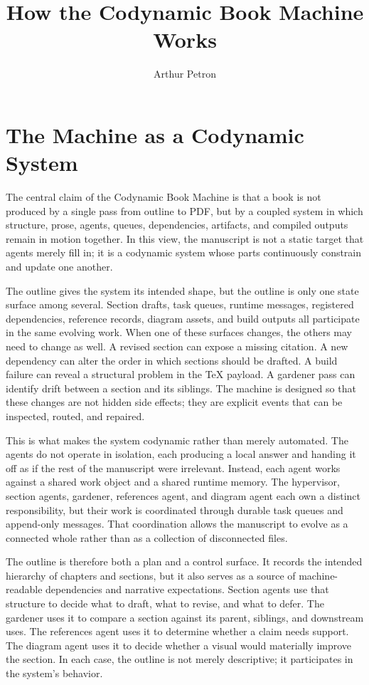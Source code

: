 \documentclass[11pt]{article}
\title{How the Codynamic Book Machine Works}
\author{Arthur Petron}
\begin{document}
\section*{The Machine as a Codynamic System}

The central claim of the Codynamic Book Machine is that a book is not produced by a single pass from outline to PDF, but by a coupled system in which structure, prose, agents, queues, dependencies, artifacts, and compiled outputs remain in motion together. In this view, the manuscript is not a static target that agents merely fill in; it is a codynamic system whose parts continuously constrain and update one another.

The outline gives the system its intended shape, but the outline is only one state surface among several. Section drafts, task queues, runtime messages, registered dependencies, reference records, diagram assets, and build outputs all participate in the same evolving work. When one of these surfaces changes, the others may need to change as well. A revised section can expose a missing citation. A new dependency can alter the order in which sections should be drafted. A build failure can reveal a structural problem in the TeX payload. A gardener pass can identify drift between a section and its siblings. The machine is designed so that these changes are not hidden side effects; they are explicit events that can be inspected, routed, and repaired.

This is what makes the system codynamic rather than merely automated. The agents do not operate in isolation, each producing a local answer and handing it off as if the rest of the manuscript were irrelevant. Instead, each agent works against a shared work object and a shared runtime memory. The hypervisor, section agents, gardener, references agent, and diagram agent each own a distinct responsibility, but their work is coordinated through durable task queues and append-only messages. That coordination allows the manuscript to evolve as a connected whole rather than as a collection of disconnected files.

The outline is therefore both a plan and a control surface. It records the intended hierarchy of chapters and sections, but it also serves as a source of machine-readable dependencies and narrative expectations. Section agents use that structure to decide what to draft, what to revise, and what to defer. The gardener uses it to compare a section against its parent, siblings, and downstream uses. The references agent uses it to determine whether a claim needs support. The diagram agent uses it to decide whether a visual would materially improve the section. In each case, the outline is not merely descriptive; it participates in the system's behavior.
\end{document}
